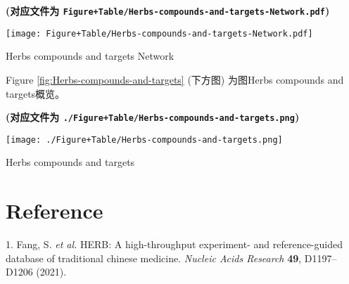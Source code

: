 \documentclass[
]{article}
\newenvironment{cslreferences}%
  {}%
  {\par}
\begin{document}
\textbf{(对应文件为 \texttt{Figure+Table/Herbs-compounds-and-targets-Network.pdf})}

\def\@captype{figure}
\begin{center}
\texttt{[image: Figure+Table/Herbs-compounds-and-targets-Network.pdf]}
\caption{Herbs compounds and targets Network}\label{fig:Herbs-compounds-and-targets-Network}
\end{center}

Figure \ref{fig:Herbs-compounds-and-targets} (下方图) 为图Herbs compounds and targets概览。

\textbf{(对应文件为 \texttt{./Figure+Table/Herbs-compounds-and-targets.png})}

\def\@captype{figure}
\begin{center}
\texttt{[image: ./Figure+Table/Herbs-compounds-and-targets.png]}
\caption{Herbs compounds and targets}\label{fig:Herbs-compounds-and-targets}
\end{center}

\hypertarget{bibliography}{%
\section*{Reference}\label{bibliography}}

\hypertarget{refs}{}
\begin{cslreferences}
\leavevmode\hypertarget{ref-HerbAHighThFang2021}{}%
1. Fang, S. \emph{et al.} HERB: A high-throughput experiment- and reference-guided database of traditional chinese medicine. \emph{Nucleic Acids Research} \textbf{49}, D1197--D1206 (2021).
\end{cslreferences}
\end{document}
